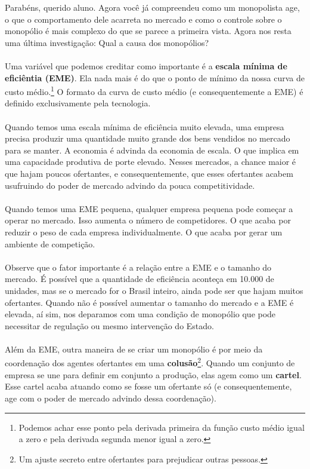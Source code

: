 \documentclass[a4paper,11pt,oneside]{book}
\theoremstyle{definition}
\theoremstyle{break}
\begin{document}
Parabéns, querido aluno. Agora você já compreendeu como um monopolista age, o que o comportamento dele acarreta no mercado e como o controle sobre o monopólio é mais complexo do que se parece a primeira vista. Agora nos resta uma última investigação: Qual a causa dos monopólios?
\\
\\
Uma variável que podemos creditar como importante é a \textbf{escala mínima de eficiêntia (EME)}. Ela nada mais é do que o ponto de mínimo da nossa curva de custo médio.\footnote{Podemos achar esse ponto pela derivada primeira da função custo médio igual a zero e pela derivada segunda menor igual a zero.} O formato da curva de custo médio (e consequentemente a EME) é definido exclusivamente pela tecnologia.
\\
\\
Quando temos uma escala mínima de eficiência muito elevada, uma empresa precisa produzir uma quantidade muito grande dos bens vendidos no mercado para se manter. A economia é advinda da economia de escala. O que implica em uma capacidade produtiva de porte elevado. Nesses mercados, a chance maior é que hajam poucos ofertantes, e consequentemente, que esses ofertantes acabem usufruindo do poder de mercado advindo da pouca competitividade.
\\
\\
Quando temos uma EME pequena, qualquer empresa pequena pode começar a operar no mercado. Isso aumenta o número de competidores. O que acaba por reduzir o peso de cada empresa individualmente. O que acaba por gerar um ambiente de competição.
\\
\\
Observe que o fator importante é a relação entre a EME e o tamanho do mercado. É possível que a quantidade de eficiência aconteça em 10.000 de unidades, mas se o mercado for o Brasil inteiro, ainda pode ser que hajam muitos ofertantes. Quando não é possível aumentar o tamanho do mercado e a EME é elevada, aí sim, nos deparamos com uma condição de monopólio que pode necessitar de regulação ou mesmo intervenção do Estado.
\\
\\
Além da EME, outra maneira de se criar um monopólio é por meio da coordenação dos agentes ofertantes em uma \textbf{colusão}\footnote{Um ajuste secreto entre ofertantes para prejudicar outras pessoas.}. Quando um conjunto de empresa se une para definir em conjunto a produção, elas agem como um \textbf{cartel}. Esse cartel acaba atuando como se fosse um ofertante só (e consequentemente, age com o poder de mercado advindo dessa coordenação).
\end{document}
